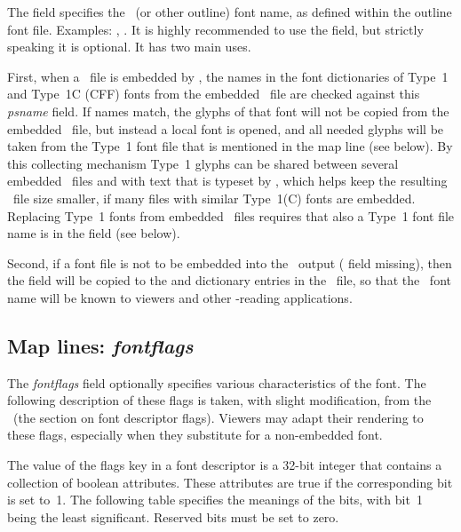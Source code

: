 \documentclass{pdftexmanual}
\begin{document}
The  field specifies the \POSTSCRIPT\ (or other outline)
font name, as defined within the outline font file. Examples:
, . It is highly recommended to use
the  field, but strictly speaking it is optional. It has
two main uses.

First, when a \PDF\ file is embedded by , the
 names in the font dictionaries of Type~1 and Type~1C
(CFF) fonts from the embedded \PDF\ file are checked against this {\em
psname} field. If names match, the glyphs of that font will not be
copied from the embedded \PDF\ file, but instead a local font is opened,
and all needed glyphs will be taken from the Type~1 font file that is
mentioned in the map line (see  below). By this
collecting mechanism Type~1 glyphs can be shared between several
embedded \PDF\ files and with text that is typeset by \PDFTEX, which
helps keep the resulting \PDF\ file size smaller, if many files with
similar Type~1(C) fonts are embedded. Replacing Type~1 fonts from
embedded \PDF\ files requires that also a Type~1 font file name is in
the  field (see below).

Second, if a font file is not to be embedded into the \PDF\ output
( field missing), then the  field will
be copied to the  and  dictionary
entries in the \PDF\ file, so that the \POSTSCRIPT\ font name will be
known to viewers and other \PDF-reading applications.

\subsection{Map lines: \emph{fontflags}}

The \emph{fontflags} field optionally specifies various characteristics
of the font. The following description of these flags is taken, with
slight modification, from the \PDFReference\ (the section on font
descriptor flags). Viewers may adapt their rendering to these flags,
especially when they substitute for a non-embedded font.

The value of the flags key in a font descriptor is a 32-bit integer that
contains a collection of boolean attributes. These attributes are true
if the corresponding bit is set to~1. The following table specifies the
meanings of the bits, with bit~1 being the least significant. Reserved
bits must be set to zero.
\end{document}
